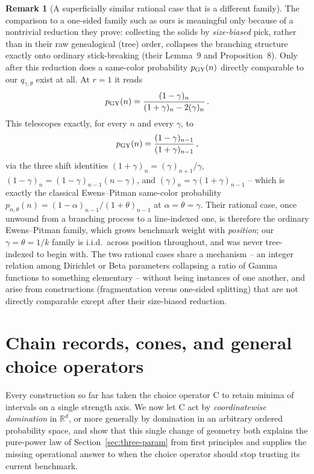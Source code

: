 \documentclass[11pt]{article}
\newcommand{\RR}{\mathbb{R}}
\theoremstyle{plain}
\theoremstyle{definition}
\newtheorem{remark}[theorem]{Remark}
\begin{document}
\begin{remark}[A superficially similar rational case that is a different family]
The comparison to a one-sided family such as ours is meaningful only because of a nontrivial reduction they prove: collecting the solids by \emph{size-biased} pick, rather than in their raw genealogical (tree) order, collapses the branching structure exactly onto ordinary stick-breaking (their Lemma~9 and Proposition~8). Only after this reduction does a same-color probability \(p_{\rm GY}(n)\) directly comparable to our \(q_{\gamma,\theta}\) exist at all. At \(r=1\) it reads
\[
p_{\rm GY}(n)=\frac{(1-\gamma)_n}{(1+\gamma)_n-2(\gamma)_n}\,.
\]
This telescopes exactly, for every \(n\) and every \(\gamma\), to
\[
p_{\rm GY}(n)=\frac{(1-\gamma)_{n-1}}{(1+\gamma)_{n-1}}\,,
\]
via the three shift identities \((1+\gamma)_n=(\gamma)_{n+1}/\gamma\), \((1-\gamma)_n=(1-\gamma)_{n-1}(n-\gamma)\), and \((\gamma)_n=\gamma(1+\gamma)_{n-1}\) -- which is exactly the classical Ewens--Pitman same-color probability \(p_{\alpha,\theta}(n)=(1-\alpha)_{n-1}/(1+\theta)_{n-1}\) at \(\alpha=\theta=\gamma\). Their rational case, once unwound from a branching process to a line-indexed one, is therefore the ordinary Ewens--Pitman family, which grows benchmark weight with \emph{position}; our \(\gamma=\theta=1/k\) family is i.i.d.\ across position throughout, and was never tree-indexed to begin with. The two rational cases share a mechanism -- an integer relation among Dirichlet or Beta parameters collapsing a ratio of Gamma functions to something elementary -- without being instances of one another, and arise from constructions (fragmentation versus one-sided splitting) that are not directly comparable except after their size-biased reduction.
\end{remark}

\section{Chain records, cones, and general choice operators}
\label{sec:chain-records}

Every construction so far has taken the choice operator {\rm C} to retain minima
of intervals on a single strength axis. We now let {\rm C} act by
\emph{coordinatewise domination} in \(\RR^d\), or more generally by domination
in an arbitrary ordered probability space, and show that this single change of
geometry both explains the pure-power law of Section~\ref{sec:three-param} from
first principles and supplies the missing operational answer to when the
choice operator should stop trusting its current benchmark.
\end{document}
